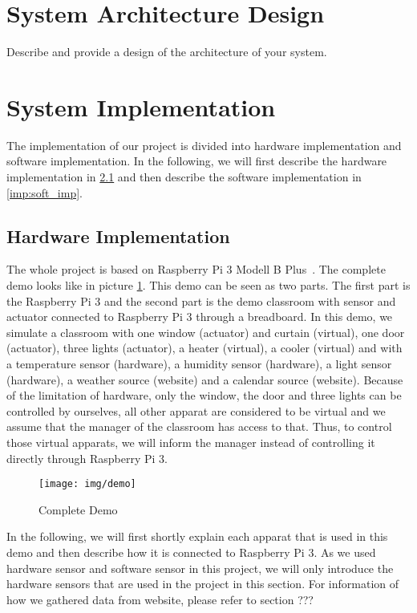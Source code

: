\documentclass[runningheads]{llncs}
\begin{document}
\section{System Architecture Design}
Describe and provide a design of the architecture of your system.

\section{System Implementation}
\label{sec:imp}
The implementation of our project is divided into hardware implementation and software implementation. In the following, we will first describe the hardware implementation in \ref{imp:hard_imp} and then describe the software implementation in \ref{imp:soft_imp}.

\subsection{Hardware Implementation}
\label{imp:hard_imp}
The whole project is based on Raspberry Pi 3 Modell B Plus~\cite{pi3}. The complete demo looks like in picture \ref{pic:demo}. This demo can be seen as two parts. The first part is the Raspberry Pi 3 and the second part is the demo classroom with sensor and actuator connected to Raspberry Pi 3 through a breadboard. In this demo, we simulate a classroom with one window (actuator) and curtain (virtual), one door (actuator), three lights (actuator), a heater (virtual), a cooler (virtual) and with a temperature sensor (hardware), a humidity sensor (hardware), a light sensor (hardware), a weather source (website) and a calendar source (website). Because of the limitation of hardware, only the window, the door and three lights can be controlled by ourselves, all other apparat are considered to be virtual and we assume that the manager of the classroom has access to that. Thus, to control those virtual apparats, we will inform the manager instead of controlling it directly through Raspberry Pi 3.

\begin{figure}[H]
\centering
\texttt{[image: img/demo]}
\caption{Complete Demo} 
\label{pic:demo}
\end{figure}

In the following, we will first shortly explain each apparat that is used in this demo and then describe how it is connected to Raspberry Pi 3. As we used hardware sensor and software sensor in this project, we will only introduce the hardware sensors that are used in the project in this section. For information of how we gathered data from website, please refer to section ???
\end{document}
